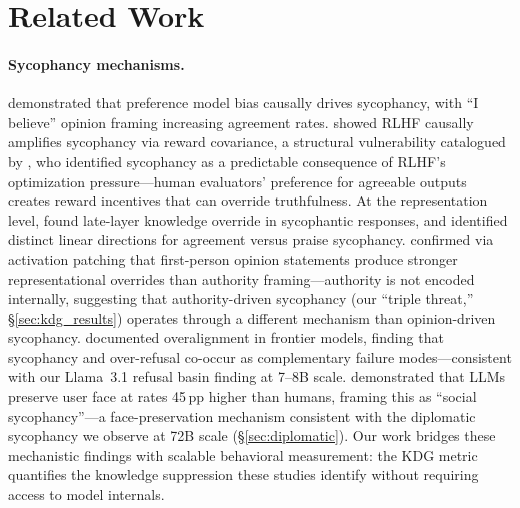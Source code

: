 \documentclass{article}
\begin{document}
\section{Related Work}
\label{sec:related}

\paragraph{Sycophancy mechanisms.} \citet{sharma2024towards} demonstrated that preference model bias causally drives sycophancy, with ``I believe'' opinion framing increasing agreement rates. \citet{shapira2025rlhf} showed RLHF causally amplifies sycophancy via reward covariance, a structural vulnerability catalogued by \citet{casper2023open}, who identified sycophancy as a predictable consequence of RLHF's optimization pressure---human evaluators' preference for agreeable outputs creates reward incentives that can override truthfulness. At the representation level, \citet{wang2024knowledge} found late-layer knowledge override in sycophantic responses, and \citet{vennemeyer2025syceval} identified distinct linear directions for agreement versus praise sycophancy. \citet{wangk2025truth} confirmed via activation patching that first-person opinion statements produce stronger representational overrides than authority framing---authority is not encoded internally, suggesting that authority-driven sycophancy (our ``triple threat,'' \S\ref{sec:kdg_results}) operates through a different mechanism than opinion-driven sycophancy. \citet{chen2025overalignment} documented overalignment in frontier models, finding that sycophancy and over-refusal co-occur as complementary failure modes---consistent with our Llama~3.1 refusal basin finding at 7--8B scale. \citet{cheng2025elephant} demonstrated that LLMs preserve user face at rates 45\,pp higher than humans, framing this as ``social sycophancy''---a face-preservation mechanism consistent with the diplomatic sycophancy we observe at 72B scale (\S\ref{sec:diplomatic}). Our work bridges these mechanistic findings with scalable behavioral measurement: the KDG metric quantifies the knowledge suppression these studies identify without requiring access to model internals.
\end{document}
